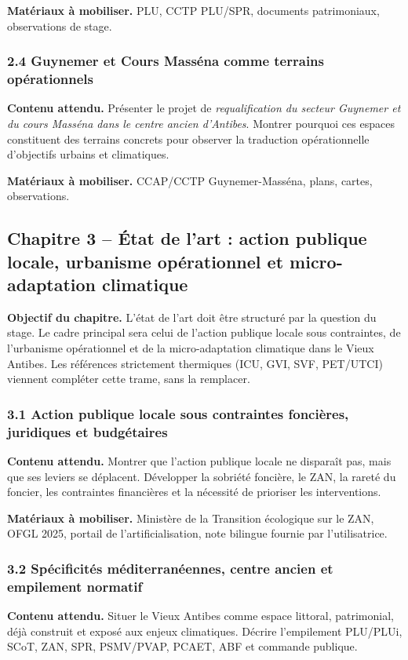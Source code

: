 \documentclass[11pt,a4paper]{article}
\begin{document}
\textbf{Matériaux à mobiliser.} PLU, CCTP PLU/SPR, documents patrimoniaux, observations de stage.

\subsubsection{2.4 Guynemer et Cours Masséna comme terrains opérationnels}
\textbf{Contenu attendu.} Présenter le projet de \emph{requalification du secteur Guynemer et du cours Masséna dans le centre ancien d'Antibes}. Montrer pourquoi ces espaces constituent des terrains concrets pour observer la traduction opérationnelle d'objectifs urbains et climatiques.

\textbf{Matériaux à mobiliser.} CCAP/CCTP Guynemer-Masséna, plans, cartes, observations.

\subsection{Chapitre 3 -- État de l'art : action publique locale, urbanisme opérationnel et micro-adaptation climatique}

\textbf{Objectif du chapitre.} L'état de l'art doit être structuré par la question du stage. Le cadre principal sera celui de l'action publique locale sous contraintes, de l'urbanisme opérationnel et de la micro-adaptation climatique dans le Vieux Antibes. Les références strictement thermiques (ICU, GVI, SVF, PET/UTCI) viennent compléter cette trame, sans la remplacer.

\subsubsection{3.1 Action publique locale sous contraintes foncières, juridiques et budgétaires}
\textbf{Contenu attendu.} Montrer que l'action publique locale ne disparaît pas, mais que ses leviers se déplacent. Développer la sobriété foncière, le ZAN, la rareté du foncier, les contraintes financières et la nécessité de prioriser les interventions.

\textbf{Matériaux à mobiliser.} Ministère de la Transition écologique sur le ZAN, OFGL 2025, portail de l'artificialisation, note bilingue fournie par l'utilisatrice.

\subsubsection{3.2 Spécificités méditerranéennes, centre ancien et empilement normatif}
\textbf{Contenu attendu.} Situer le Vieux Antibes comme espace littoral, patrimonial, déjà construit et exposé aux enjeux climatiques. Décrire l'empilement PLU/PLUi, SCoT, ZAN, SPR, PSMV/PVAP, PCAET, ABF et commande publique.
\end{document}
